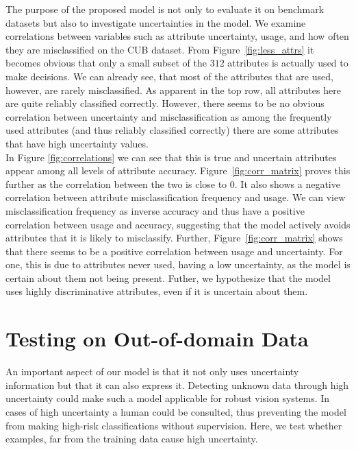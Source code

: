 \documentclass[a4paper,cleardoubleempty,BCOR1cm, 11pt]{report}
\begin{document}
The purpose of the proposed model is not only to evaluate it on benchmark datasets but also to investigate uncertainties in the model. We examine correlations between variables such as attribute uncertainty, usage, and how often they are misclassified on the CUB dataset. From Figure~\ref{fig:less_attrs} it becomes obvious that only a small subset of the $312$ attributes is actually used to make decisions. We can already see, that most of the attributes that are used, however, are rarely misclassified. As apparent in the top row, all attributes here are quite reliably classified correctly. However, there seems to be no obvious correlation between uncertainty and misclassification as among the frequently used attributes (and thus reliably classified correctly) there are some attributes that have high uncertainty values.\\
In Figure \ref{fig:correlations} we can see that this is true and uncertain attributes appear among all levels of attribute accuracy. Figure~\ref{fig:corr_matrix} proves this  further as the correlation between the two is close to $0$. It also shows a negative correlation between attribute misclassification frequency and usage.
We can view misclassification frequency as inverse accuracy and thus have a positive correlation between usage and accuracy, suggesting that the model actively avoids attributes that it is likely to misclassify. Further, Figure~\ref{fig:corr_matrix} shows that there seems to be a positive correlation between usage and uncertainty. For one, this is due to attributes never used, having a low uncertainty, as the model is certain about them not being present. Futher, we hypothesize that the model uses highly discriminative attributes, even if it is uncertain about them.




\section{Testing on Out-of-domain Data}\label{sec:zero_shot}
An important aspect of our model is that it not only uses uncertainty information but that it can also express it. Detecting unknown data through high uncertainty could make such a model applicable for robust vision systems. In cases of high uncertainty a human could be consulted, thus preventing the model from making high-risk classifications without supervision. Here, we test whether examples, far from the training data cause high uncertainty.
\end{document}
